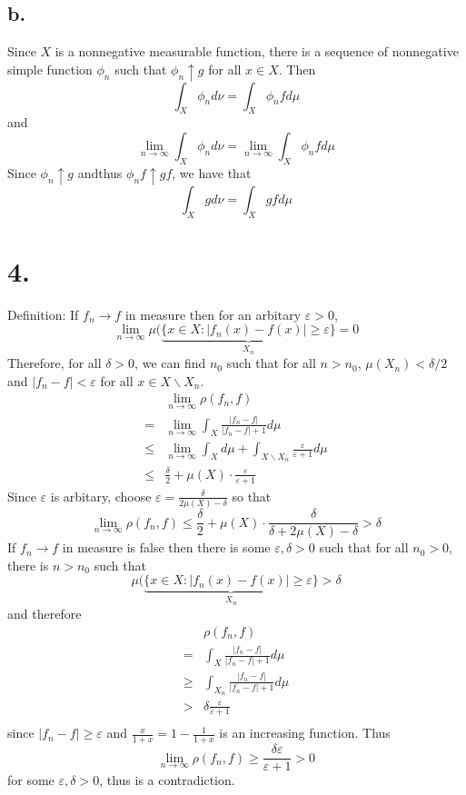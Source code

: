 \documentclass[11pt]{article}
\theoremstyle{mystyle}
\theoremstyle{definition}
\begin{document}
\subsection*{b.}
Since $X$ is a nonnegative measurable function, there is a sequence of nonnegative simple function $\phi_n$ such that $\phi_n \uparrow g$ for all $x \in X$. Then 
\[
  \int_X \phi_n d\nu = \int_X \phi_n f d\mu
\]
and 
\[
  \lim_{n \to \infty} \int_X \phi_n d\nu = \lim_{n \to \infty} \int_X \phi_n f d\mu
\]
Since $\phi_n \uparrow g$ andthus $\phi_n f \uparrow gf$, we have that 
\[
  \int_X g d\nu = \int_X gf d\mu
\]
\newpage
\section*{4.}
Definition: If $f_n \to f$ in measure then for an arbitary $\varepsilon > 0$,  
\[
  \lim_{n \to \infty} \mu(\underbrace{\{x \in X: |f_n(x) - f(x)| \ge \varepsilon\}}_{X_n} = 0
\]
Therefore, for all $\delta > 0$, we can find $n_0$ such that for all $n>n_0$, $\mu(X_n) < \delta/2$ and $|f_n-f| < \varepsilon$ for all $x \in X \backslash X_n$.  
\begin{align*} 
  &\lim_{n \to \infty} \rho(f_n, f) \\ 
  =& \lim_{n \to \infty} \int_X \displaystyle\frac{|f_n-f|}{|f_n - f| + 1} d\mu \\
  \le& \lim_{n \to \infty} \int_X d\mu + \int_{X\backslash X_n} \displaystyle\frac{\varepsilon}{\varepsilon + 1} d\mu \\
  \le& \displaystyle\frac{\delta}{2} + \mu(X) \cdot \displaystyle\frac{\varepsilon}{\varepsilon + 1}  
\end{align*}
Since $\varepsilon$ is arbitary, choose $\varepsilon = \displaystyle\frac{\delta}{2\mu(X)-\delta}$ so that 
\[
  \lim_{n \to \infty} \rho(f_n, f) \le \displaystyle\frac{\delta}{2} + \mu(X) \cdot \displaystyle\frac{\delta}{\delta + 2\mu(X) - \delta} > \delta
\]
If $f_n \to f$ in measure is false then there is some $\varepsilon, \delta > 0$ such that for all $n_0 > 0$, there is $n> n_0$ such that 
\[ 
  \mu(\underbrace{\{x \in X: |f_n(x) - f(x)| \ge \varepsilon\}}_{X_n} > \delta
\]
and therefore
\begin{align*}
  &\rho(f_n, f) \\
  =& \int_X \displaystyle\frac{|f_n-f|}{|f_n - f| + 1} d\mu \\
  \ge& \int_{X_n} \displaystyle\frac{|f_n-f|}{|f_n-f|+ 1} d\mu \\
  > & \delta \displaystyle\frac{\varepsilon}{\varepsilon + 1} \\
\end{align*} 
since $|f_n - f| \ge \varepsilon$ and $\displaystyle\frac{x}{1+x} = 1 - \displaystyle\frac{1}{1+x}$ is an increasing function. Thus 
\[
  \lim_{n \to \infty} \rho(f_n, f) \ge \displaystyle\frac{\delta \varepsilon}{\varepsilon+1} > 0
\]
for some $\varepsilon, \delta > 0$, thus is a contradiction. 
\newpage
\end{document}
